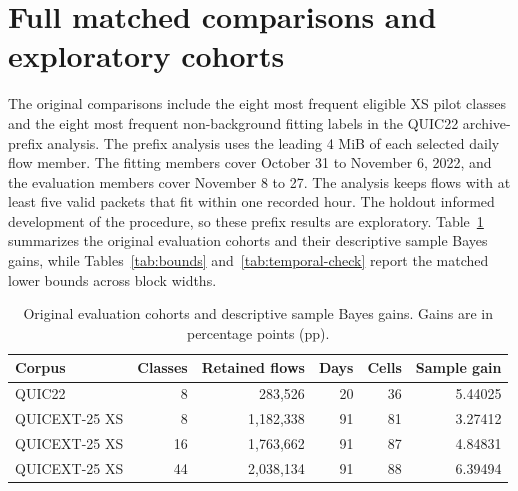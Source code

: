 \documentclass[preprint,11pt]{elsarticle}
\begin{document}
\section{Full matched comparisons and exploratory cohorts}
\label{app:full-comparisons}

The original comparisons include the eight most frequent eligible XS pilot classes and the eight most frequent non-background fitting labels in the QUIC22 archive-prefix analysis. The prefix analysis uses the leading 4 MiB of each selected daily flow member. The fitting members cover October 31 to November 6, 2022, and the evaluation members cover November 8 to 27. The analysis keeps flows with at least five valid packets that fit within one recorded hour. The holdout informed development of the procedure, so these prefix results are exploratory. Table~\ref{tab:cohorts} summarizes the original evaluation cohorts and their descriptive sample Bayes gains, while Tables~\ref{tab:bounds} and~\ref{tab:temporal-check} report the matched lower bounds across block widths.

\begin{table}[!ht]
\centering
\small
\caption{Original evaluation cohorts and descriptive sample Bayes gains. Gains are in percentage points (pp).}
\label{tab:cohorts}
\begin{tabular}{lrrrrr}
\toprule
Corpus & Classes & Retained flows & Days & Cells & Sample gain \\
\midrule
QUIC22 & 8 & 283,526 & 20 & 36 & 5.44025 \\
QUICEXT-25 XS & 8 & 1,182,338 & 91 & 81 & 3.27412 \\
QUICEXT-25 XS & 16 & 1,763,662 & 91 & 87 & 4.84831 \\
QUICEXT-25 XS & 44 & 2,038,134 & 91 & 88 & 6.39494 \\
\bottomrule
\end{tabular}
\end{table}
\end{document}
